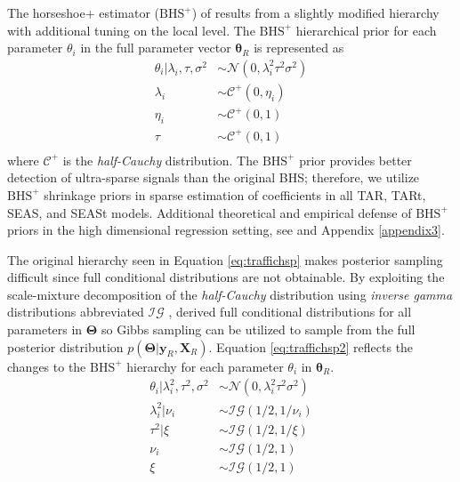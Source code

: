 The horseshoe+ estimator ($\textrm{BHS}^+$) of \cite{Bhadra2016} results from a slightly modified hierarchy with additional tuning on the local level. The $\textrm{BHS}^+$ hierarchical prior for each parameter $\theta_i$ in the full parameter vector $\bm{\theta}_R$ is represented as
\begin{equation}
\label{eq:traffichsp}
\begin{split}
	\theta_i|\lambda_i,\tau,\sigma^2 & \sim \mathcal{N}(0,\lambda^2_i\tau^2\sigma^2) \\
	\lambda_i &\sim \mathcal{C}^+(0,\eta_i)\\
	\eta_i & \sim \mathcal{C}^+(0,1)\\
	\tau &\sim \mathcal{C}^+(0,1)\\
\end{split}
\end{equation}
where $\mathcal{C}^+$ is the \textit{half-Cauchy} distribution. The $\textrm{BHS}^+$ prior provides better detection of ultra-sparse signals than the original BHS; therefore, we utilize $\textrm{BHS}^+$ shrinkage priors in sparse estimation of coefficients in all TAR, TARt, SEAS, and SEASt models.  Additional theoretical and empirical defense of $\textrm{BHS}^+$ priors in the high dimensional regression setting, see \cite{Bhadra2016} and Appendix \ref{appendix3}.

The original hierarchy seen in Equation \ref{eq:traffichsp} makes posterior sampling difficult since full conditional distributions are not obtainable. By exploiting the scale-mixture decomposition of the \textit{half-Cauchy} distribution using \textit{inverse gamma} distributions abbreviated $\mathcal{IG}$ \citep{Wand2011}, \cite{Makalic2016b} derived full conditional distributions for all parameters in $\bm{\Theta}$ so Gibbs sampling \citep{Geman1987,Gelfand1990} can be utilized to sample from the full posterior distribution $p(\bm{\Theta}|\bm{y}_R,\bm{X}_R)$. Equation \ref{eq:traffichsp2} reflects the changes to the $\textrm{BHS}^+$ hierarchy for each parameter $\theta_i$ in $\bm{\theta}_R$.
\begin{equation}
\label{eq:traffichsp2}
\begin{split}
\theta_i|\lambda_i^2,\tau^2,\sigma^2 & \sim \mathcal{N}(0,\lambda_i^2\tau^2\sigma^2) \\
\lambda^2_i|\nu_i & \sim \mathcal{IG}(1/2,1/\nu_i)\\
\tau^2|\xi & \sim \mathcal{IG}(1/2,1/\xi)\\
\nu_i & \sim \mathcal{IG}(1/2,1) \\
\xi & \sim \mathcal{IG}(1/2,1) \\
\end{split}
\end{equation}

